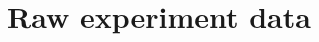 \documentclass[journal,onecolumn,12pt]{IEEEtran}
\begin{document}
%

\newpage
\printbibliography
\newpage

\appendices
\section{Raw experiment data}
\label{appendix:tables}
\end{document}

